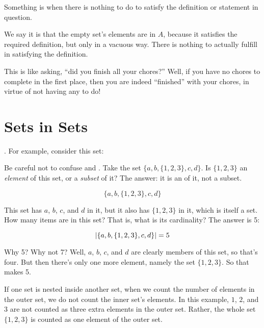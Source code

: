 \documentclass[../../../main.tex]{subfiles}
\begin{document}
\begin{terminology}
  Something is  when there is nothing to do to satisfy the definition or statement in question.
\end{terminology}

We say it is  that the empty set's elements are in $A$, because it satisfies the required definition, but only in a vacuous way. There is nothing to actually fulfill in satisfying the definition. 

This is like asking, ``did you finish all your chores?'' Well, if you have no chores to complete in the first place, then you are indeed ``finished'' with your chores, in virtue of not having any to do!


\section{Sets in Sets}

. For example, consider this set:

\begin{aside}
  \begin{remark}
    Be careful not to confuse  and . Take the set $\{ a, b, \{ 1, 2, 3 \}, c, d \}$. Is $\{ 1, 2, 3 \}$ an \emph{element} of this set, or a \emph{subset} of it? The answer: it is an  of it, not a subset.
  \end{remark}
\end{aside}

\begin{equation*}
  \{ a, b, \{ 1, 2, 3 \}, c, d \}
\end{equation*}

This set has $a$, $b$, $c$, and $d$ in it, but it also has $\{ 1, 2, 3 \}$ in it, which is itself a set. How many items are in this set? That is, what is its cardinality? The answer is 5:

\begin{equation*}
  |\{ a, b, \{ 1, 2, 3 \}, c, d \}| = 5
\end{equation*}

Why 5? Why not 7? Well, $a$, $b$, $c$, and $d$ are clearly members of this set, so that's four. But then there's only one more element, namely the set $\{ 1, 2, 3 \}$. So that makes 5.

\begin{aside}
  \begin{remark}
    If one set is nested inside another set, when we count the number of elements in the outer set, we do not count the inner set's elements. In this example, $1$, $2$, and $3$ are not counted as three extra elements in the outer set. Rather, the whole set $\{ 1, 2, 3 \}$ is counted as one element of the outer set.
  \end{remark}
\end{aside}
\end{document}
